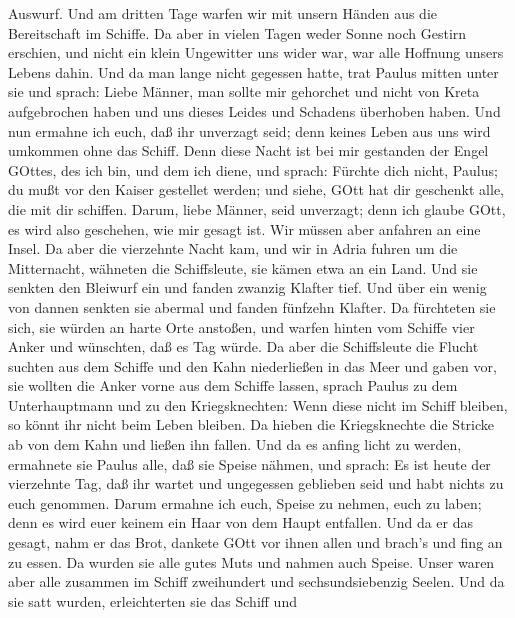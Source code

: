 Auswurf.  Und am dritten Tage warfen wir mit unsern Händen
aus die Bereitschaft im Schiffe.  Da aber in vielen Tagen
weder Sonne noch Gestirn erschien, und nicht ein klein Ungewitter uns
wider war, war alle Hoffnung unsers Lebens dahin.  Und da
man lange nicht gegessen hatte, trat Paulus mitten unter sie und sprach:
Liebe Männer, man sollte mir gehorchet und nicht von Kreta aufgebrochen
haben und uns dieses Leides und Schadens überhoben haben. 
Und nun ermahne ich euch, daß ihr unverzagt seid; denn keines Leben aus
uns wird umkommen ohne das Schiff.  Denn diese Nacht ist
bei mir gestanden der Engel GOttes, des ich bin, und dem ich diene,
 und sprach: Fürchte dich nicht, Paulus; du mußt vor den
Kaiser gestellet werden; und siehe, GOtt hat dir geschenkt alle, die mit
dir schiffen.  Darum, liebe Männer, seid unverzagt; denn
ich glaube GOtt, es wird also geschehen, wie mir gesagt ist.
 Wir müssen aber anfahren an eine Insel.  Da
aber die vierzehnte Nacht kam, und wir in Adria fuhren um die
Mitternacht, wähneten die Schiffsleute, sie kämen etwa an ein Land.
 Und sie senkten den Bleiwurf ein und fanden zwanzig
Klafter tief. Und über ein wenig von dannen senkten sie abermal und
fanden fünfzehn Klafter.  Da fürchteten sie sich, sie
würden an harte Orte anstoßen, und warfen hinten vom Schiffe vier Anker
und wünschten, daß es Tag würde.  Da aber die Schiffsleute
die Flucht suchten aus dem Schiffe und den Kahn niederließen in das Meer
und gaben vor, sie wollten die Anker vorne aus dem Schiffe lassen,
 sprach Paulus zu dem Unterhauptmann und zu den
Kriegsknechten: Wenn diese nicht im Schiff bleiben, so könnt ihr nicht
beim Leben bleiben.  Da hieben die Kriegsknechte die
Stricke ab von dem Kahn und ließen ihn fallen.  Und da es
anfing licht zu werden, ermahnete sie Paulus alle, daß sie Speise
nähmen, und sprach: Es ist heute der vierzehnte Tag, daß ihr wartet und
ungegessen geblieben seid und habt nichts zu euch genommen.
 Darum ermahne ich euch, Speise zu nehmen, euch zu laben;
denn es wird euer keinem ein Haar von dem Haupt entfallen. 
Und da er das gesagt, nahm er das Brot, dankete GOtt vor ihnen allen und
brach's und fing an zu essen.  Da wurden sie alle gutes
Muts und nahmen auch Speise.  Unser waren aber alle
zusammen im Schiff zweihundert und sechsundsiebenzig Seelen.
 Und da sie satt wurden, erleichterten sie das Schiff und
